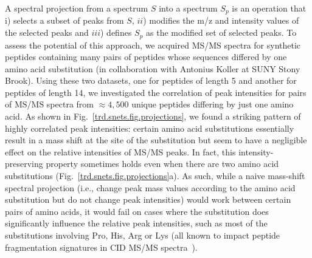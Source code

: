 \documentclass[arial,11pt]{article}
\begin{document}


A spectral projection from a spectrum $S$ into a spectrum $S_p$ is an operation that i) selects a subset of peaks from $S$, $ii$) modifies the m/z and intensity values of the selected peaks and $iii$) defines $S_p$ as the modified set of selected peaks. To assess the potential of this approach, we acquired MS/MS spectra for synthetic peptides containing many pairs of peptides whose sequences differed by one amino acid substitution (in collaboration with Antonius Koller at SUNY Stony Brook). Using these two datasets, one for peptides of length 5 and another for peptides of length 14, we investigated the correlation of peak intensities for pairs of MS/MS spectra from $\approx 4,500$ unique peptides differing by just one amino acid. As shown in Fig.~\ref{trd.snets.fig.projections}, we found a striking pattern of highly correlated peak intensities: certain amino acid substitutions essentially result in a mass shift at the site of the substitution but seem to have a negligible effect on the relative intensities of MS/MS peaks. In fact, this intensity-preserving property sometimes holds even when there are two amino acid substitutions (Fig.~\ref{trd.snets.fig.projections}a).
%
As such, while a naive mass-shift spectral projection (i.e., change peak mass values according to the amino acid substitution but do not change peak intensities) would work between certain pairs of amino acids, it would fail on cases where the substitution does significantly influence the relative peak intensities, such as most of the substitutions involving Pro, His, Arg or Lys (all known to impact peptide fragmentation signatures in CID MS/MS spectra~\cite{gucinski10}).
\end{document}
